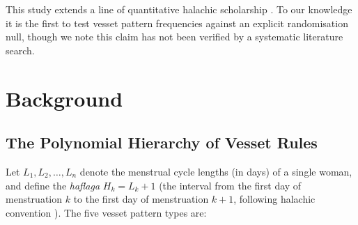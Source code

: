 \documentclass[12pt]{article}
\begin{document}
This study extends a line of quantitative halachic scholarship \cite{anon2022markov,
anon2019reliability,anon2021statistical}. To our knowledge it is the first to test vesset pattern frequencies against
an explicit randomisation null, though we note this claim has not been verified
by a systematic literature search.

\section{Background}

\subsection{The Polynomial Hierarchy of Vesset Rules}

Let $L_1, L_2, \ldots, L_n$ denote the menstrual cycle lengths (in days) of a single
woman, and define the \textit{haflaga} $H_k = L_k + 1$ (the interval from the first
day of menstruation $k$ to the first day of menstruation $k+1$, following halachic
convention \cite{anon2021statistical}). The five vesset pattern types are:
\end{document}
